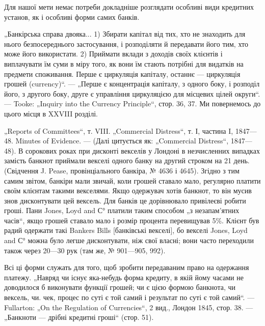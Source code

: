 Для нашої мети немає потреби докладніше розглядати особливі види кредитних установ, як і особливі
форми самих банків.

„Банкірська справа двояка... 1) Збирати капітал від тих, хто не знаходить
для нього безпосереднього застосування, і розподіляти й передавати його
тим, хто може його використати. 2) Приймати вклади з доходів своїх клієнтів
і виплачувати їм суми в міру того, як вони їм стають потрібні для видатків
на предмети споживання. Перше є циркуляція капіталу, останнє — циркуляція
грошей (currency)“. — „Перше є концентрація капіталу, з одного боку, і розподіл його, з другого
боку, друге є управління циркуляцією для місцевих
цілей округи“. — Tooke: „Inquiry into the Currency Principle“, стор. 36, 37. Ми
повернемось до цього місця в XXVIII розділі.

„Reports of Committees“, т. VIII. „Commercial Distress“, т. І, частина I, 1847—48.
Minutes of Evidence. — (Далі цитується як: „Commercial Distress“, 1847—48). В сорокових роках при
дисконті векселів у Лондоні в незчисленних випадках замість банкнот приймали векселі одного банку на
другий строком на 21 день.
(Свідчення J. Pease, провінціального банкіра, № 4636 і 4645). Згідно з тим самим звітом, банкіри
мали звичай, коли грошей ставало мало, регулярно платити
своїм клієнтам такими векселями. Якщо одержувач хотів банкнот, то він мусив
знов дисконтувати цей вексель. Для банків це дорівнювало привілеєві робити
гроші. Пани Jones, Loyd and С° платили таким способом „з незапам’ятних часів“,
якщо грошей ставало мало і розмір процента перевищував 5\%. Клієнт був
радий одержати такі Bankers Bills [банківські векселі], бо векселі Jones, Loyd
and С° можна було легше дисконтувати, ніж свої власні; вони часто переходили також через 20—30 рук
(там же, № 901—905, 992).

Всі ці форми служать для того, щоб зробити передаваним право на одержання платежу. „Навряд чи існує
яка-небудь форма кредиту, в якій йому часами
не доводилося б виконувати функції грошей; чи є цією формою банкнота, чи
вексель, чи. чек, процес по суті є той самий і результат по суті є той самий“. — Fullarton: „On the
Regulation of Currencies“, 2 вид., Лондон 1845, стор. 38. — „Банкноти — дрібні кредитні гроші“
(стор. 51).

